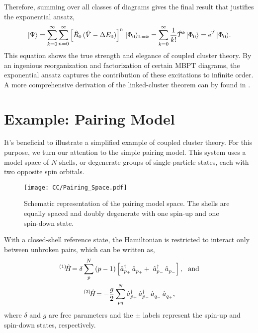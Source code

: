 \documentclass[thesis.tex]{subfiles}
\begin{document}
Therefore, summing over all classes of diagrams gives the final result that justifies the exponential ansatz,
\begin{equation}
  \hspace{1pt}\lvert \Psi \rangle = \sum_{k=0}^{\infty}\sum_{n=0}^{\infty}\left[\hat{R}_{0}\mathop{(\hat{V} - \Delta E_{0})}\right]^{n}\hspace{1pt}\lvert \Phi_{0} \rangle_{\mathrm{L=}k} = \sum_{k=0}^{\infty}\frac{1}{k!}\hat{T}\hspace{-0.25pt}^{k}\hspace{1pt}\lvert \Phi_{0} \rangle = \operatorname{e}^{\hat{T}\hspace{-0.25pt}}\hspace{1pt}\lvert \Phi_{0} \rangle.
\end{equation}
This equation shows the true strength and elegance of coupled cluster theory.  By an ingenious reorganization and factorization of certain MBPT diagrams, the exponential ansatz captures the contribution of these excitations to infinite order.  A more comprehensive derivation of the linked-cluster theorem can by found in \cite{SHAVITT2009}.

\section{Example: Pairing Model} \label{section:pairingmodel}

It's beneficial to illustrate a simplified example of coupled cluster theory.  For this purpose, we turn our attention to the simple pairing model.  This system uses a model space of $N$ shells, or degenerate groups of single-particle states, each with two opposite spin orbitals.
\begin{figure}[h]
  \centering
  \texttt{[image: CC/Pairing\_Space.pdf]}
  \caption{Schematic representation of the pairing model space.  The shells are equally spaced and doubly degenerate with one spin-up and one spin-down state.}
  \label{fig:pairing_space}
\end{figure}

With a closed-shell reference state, the Hamiltonian is restricted to interact only between unbroken pairs, which can be written as,
\begin{gather} \label{eq:pairing_ham}
  {}^{\left(1\right)}\hspace{-2pt}\hat{H}\hspace{-2pt} = \delta \sum_{p}^{N} \mathop{(p-1)} \left[ \mathop{\hat{a}^{\dagger}_{p_{+}}}\mathop{\hat{a}^{}_{p_{+}}} +\ \mathop{\hat{a}^{\dagger}_{p_{-}}}\mathop{\hat{a}^{}_{p_{-}}} \right],\ \ \text{and} \notag \\
  {}^{\left(2\right)}\hspace{-2pt}\hat{H}\hspace{-2pt} = -\frac{g}{2} \sum_{pq}^{N} \mathop{\hat{a}^{\dagger}_{p_{+}}}\mathop{\hat{a}^{\dagger}_{p_{-}}}\mathop{\hat{a}^{}_{q_{-}}}\mathop{\hat{a}^{}_{q_{+}}},
\end{gather}
where $\delta$ and $g$ are free parameters and the $\pm$ labels represent the spin-up and spin-down states, respectively.
\end{document}

